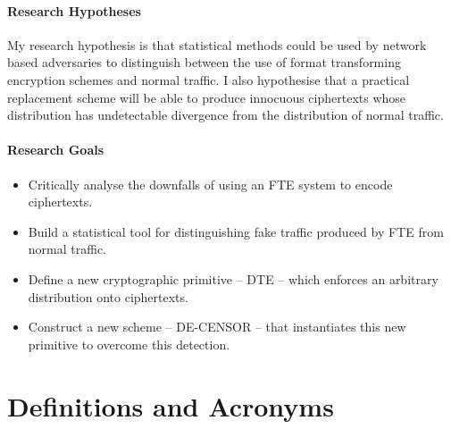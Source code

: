 \documentclass[ %
                    author={Samuel Russell},
                supervisor={Prof. Bogdan Warinschi},
                    degree={MEng},
                     title={Innocuous Ciphertexts},
                  subtitle={The DE-CENSOR Scheme},
                      type={research},
                      year={2018} ]{dissertation}
\begin{document}
\subsubsection{Research Hypotheses}

My research hypothesis is that statistical methods could be used by network based adversaries to distinguish between the use of format transforming encryption schemes and normal traffic. I also hypothesise that a practical replacement scheme will be able to produce innocuous ciphertexts whose distribution has undetectable divergence from the distribution of normal traffic.

\subsubsection{Research Goals}

\begin{itemize}
\item Critically analyse the downfalls of using an FTE system to encode ciphertexts.
\item Build a statistical tool for distinguishing fake traffic produced by FTE from normal traffic.
\item Define a new cryptographic primitive -- DTE -- which enforces an arbitrary distribution onto ciphertexts.
\item Construct a new scheme -- DE-CENSOR -- that instantiates this new primitive to overcome this detection.
\end{itemize}


\chapter{Definitions and Acronyms}

\vspace{1cm}
\end{document}
